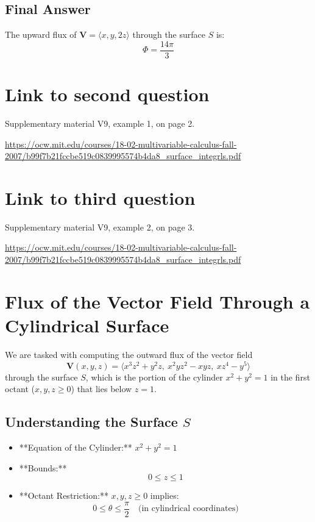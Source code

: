 \documentclass[11pt]{article}
\begin{document}
\newpage

\subsection{Final Answer}

The upward flux of \( \mathbf{V} = \langle x, y, 2z \rangle \) through the surface \( S \) is:
\[
\boxed{ \Phi = \frac{14\pi}{3} }
\]

\newpage

\section{Link to second question}
Supplementary material V9, example 1, on page 2.

\url{https://ocw.mit.edu/courses/18-02-multivariable-calculus-fall-2007/b99f7b21fccbe519c0839995574b4da8_surface_integrls.pdf}

\newpage

\section{Link to third question}
Supplementary material V9, example 2, on page 3.

\url{https://ocw.mit.edu/courses/18-02-multivariable-calculus-fall-2007/b99f7b21fccbe519c0839995574b4da8_surface_integrls.pdf}



\newpage

\section{Flux of the Vector Field Through a Cylindrical Surface}

We are tasked with computing the outward flux of the vector field
\[
\mathbf{V}(x, y, z) = \langle x^3 z^2 + y^2 z, \ x^2 y z^2 - x y z, \ x z^4 - y^5 \rangle
\]
through the surface \( S \), which is the portion of the cylinder \( x^2 + y^2 = 1 \) in the first octant (\( x, y, z \geq 0 \)) that lies below \( z = 1 \).

\newpage

\subsection{Understanding the Surface \( S \)}

\begin{itemize}
    \item **Equation of the Cylinder:** \( x^2 + y^2 = 1 \)
    \item **Bounds:**
    \[
    0 \leq z \leq 1
    \]
    \item **Octant Restriction:** \( x, y, z \geq 0 \) implies:
    \[
    0 \leq \theta \leq \frac{\pi}{2} \quad \text{(in cylindrical coordinates)}
    \]
\end{itemize}
\end{document}
